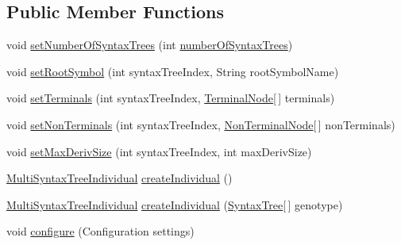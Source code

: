 \subsection*{Public Member Functions}
\begin{DoxyCompactItemize}
\item 
void \hyperlink{classnet_1_1sf_1_1jclec_1_1multisyntaxtree_1_1_multi_syntax_tree_individual_species_ac408af5c0b91c2d974337e1c956c5813}{set\-Number\-Of\-Syntax\-Trees} (int \hyperlink{classnet_1_1sf_1_1jclec_1_1multisyntaxtree_1_1_multi_syntax_tree_species_ac0191a71ecc2e1fb8372dbce8fd82c15}{number\-Of\-Syntax\-Trees})
\item 
void \hyperlink{classnet_1_1sf_1_1jclec_1_1multisyntaxtree_1_1_multi_syntax_tree_individual_species_a1a16ceeead26350b91cc93981572b40b}{set\-Root\-Symbol} (int syntax\-Tree\-Index, String root\-Symbol\-Name)
\item 
void \hyperlink{classnet_1_1sf_1_1jclec_1_1multisyntaxtree_1_1_multi_syntax_tree_individual_species_ae8929fc14a507e9cdc535ca23250ddce}{set\-Terminals} (int syntax\-Tree\-Index, \hyperlink{classnet_1_1sf_1_1jclec_1_1syntaxtree_1_1_terminal_node}{Terminal\-Node}\mbox{[}$\,$\mbox{]} terminals)
\item 
void \hyperlink{classnet_1_1sf_1_1jclec_1_1multisyntaxtree_1_1_multi_syntax_tree_individual_species_a5f19c8c4de48571d6740154c442d76de}{set\-Non\-Terminals} (int syntax\-Tree\-Index, \hyperlink{classnet_1_1sf_1_1jclec_1_1syntaxtree_1_1_non_terminal_node}{Non\-Terminal\-Node}\mbox{[}$\,$\mbox{]} non\-Terminals)
\item 
void \hyperlink{classnet_1_1sf_1_1jclec_1_1multisyntaxtree_1_1_multi_syntax_tree_individual_species_a1023d17867166b1d6f46a3b0391f9226}{set\-Max\-Deriv\-Size} (int syntax\-Tree\-Index, int max\-Deriv\-Size)
\item 
\hyperlink{classnet_1_1sf_1_1jclec_1_1multisyntaxtree_1_1_multi_syntax_tree_individual}{Multi\-Syntax\-Tree\-Individual} \hyperlink{classnet_1_1sf_1_1jclec_1_1multisyntaxtree_1_1_multi_syntax_tree_individual_species_a939e1f209e2844171773437a1aae3faa}{create\-Individual} ()
\item 
\hyperlink{classnet_1_1sf_1_1jclec_1_1multisyntaxtree_1_1_multi_syntax_tree_individual}{Multi\-Syntax\-Tree\-Individual} \hyperlink{classnet_1_1sf_1_1jclec_1_1multisyntaxtree_1_1_multi_syntax_tree_individual_species_aeb46e96725fae9691709ed44db38b9db}{create\-Individual} (\hyperlink{classnet_1_1sf_1_1jclec_1_1syntaxtree_1_1_syntax_tree}{Syntax\-Tree}\mbox{[}$\,$\mbox{]} genotype)
\item 
void \hyperlink{classnet_1_1sf_1_1jclec_1_1multisyntaxtree_1_1_multi_syntax_tree_individual_species_a63ca84ee25724e7303d9ce30586cce02}{configure} (Configuration settings)
\end{DoxyCompactItemize}
